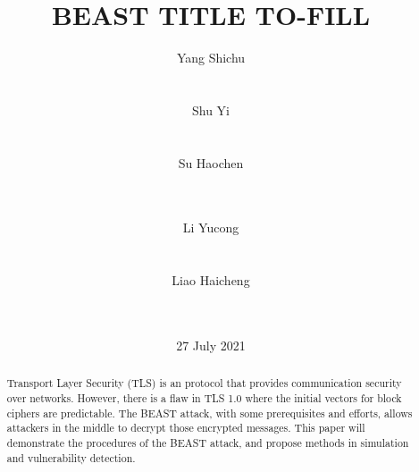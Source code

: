 \documentclass{acm_proc_article-sp}
\begin{document}
\title{
BEAST TITLE TO-FILL
}
\author{
\alignauthor
Yang Shichu\\
       \\
       \\
\alignauthor
Shu Yi\\
       \\
       \\
\alignauthor
Su Haochen\\
       \\
       \\
\and
\alignauthor
Li Yucong\\
       \\
       \\
\alignauthor
Liao Haicheng\\
       \\
       \\
}
\date{27 July 2021}
\maketitle
\begin{abstract}
Transport Layer Security (TLS) is an protocol that provides communication
security over networks. However, there is a flaw in TLS 1.0 where the initial
vectors for block ciphers are predictable. The BEAST attack, with some
prerequisites and efforts, allows attackers in the middle to decrypt those
encrypted messages.
This paper will demonstrate the procedures of the BEAST attack, and propose
methods in simulation and vulnerability detection.
\end{abstract}



\end{document}
